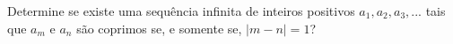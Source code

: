 Determine se existe uma sequência infinita de inteiros positivos $a_1, a_2, a_3, . . .$ tais que $a_m$ e $a_n$ são coprimos se, e somente se, $|m - n| = 1$?

